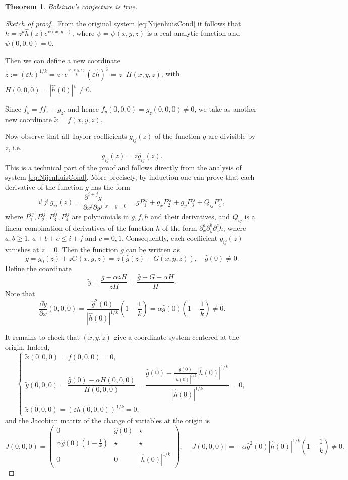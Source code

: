 \documentclass[10pt,a4paper]{amsart}
\newtheorem{Theorem}{Theorem}
\begin{document}
\begin{Theorem}
    Bolsinov's conjecture is true.
\end{Theorem}

\begin{proof}[Sketch of proof.]
From the original system \eqref{eq:NijenhuisCond} it follows that $h = z^k \hat{h}(z) e^{\psi(x,y,z)}$, where $\psi = \psi(x,y,z)$ is a real-analytic function and $\psi(0,0,0) = 0$.

Then we can define a new coordinate $\tilde z := (\varepsilon h)^{1/k} = z \cdot e^{\frac{\psi(x,y,z)}{k}}(\varepsilon \hat{h})^{\frac{1}{k}} = z \cdot H(x,y,z)$, with $H(0,0,0) = |\hat{h}(0)|^{\frac{1}{k}} \neq 0$.

Since $f_y = f f_z + g_z$, and hence $f_y(0,0,0) = g_z(0,0,0) \neq 0$, we take as another new coordinate $\tilde x = f(x,y,z)$.

Now observe that all Taylor coefficients \(g_{ij}(z)\) of the function $g$ are divisible by \(z\), i.e.
\[
g_{ij}(z)=z\hat g_{ij}(z).
\]
This is a technical part of the proof and follows directly from the analysis of system \eqref{eq:NijenhuisCond}. More precisely, by induction one can prove that each derivative of the function \(g\) has the form
\[
i!\,j!\,g_{ij}(z)
=
\frac{\partial^{i+j}g}{\partial x^i\partial y^j}\bigg|_{x=y=0}
=
gP_1^{ij}
+
g_xP_2^{ij}
+
g_yP_3^{ij}
+
Q_{ij}P_4^{ij},
\]
where \(P_1^{ij},P_2^{ij},P_3^{ij},P_4^{ij}\) are polynomials in \(g,f,h\) and their derivatives, and \(Q_{ij}\) is a linear combination of derivatives of the function $h$ of the form $\partial_x^a\partial_y^b\partial_z^c h$,
where \(a,b\ge 1\), \(a+b+c\le i+j\) and \(c=0,1\).
Consequently, each coefficient $g_{ij}(z)$ vanishes at \(z=0\).
Then the function $g$ can be written as
$$
g = g_0(z) + z G(x,y,z) = z\left(\hat{g}(z) + G(x,y,z)\right), \quad \hat{g}(0) \neq 0.
$$
Define the coordinate 
$$\tilde{y} = \frac{g - \alpha z H}{z H} = \frac{\hat{g} + G - \alpha H}{H}.$$  
Note that
$$\frac{\partial \tilde{y}}{\partial x}(0,0,0) = \frac{\hat{g}^2(0)}{|\hat{h}(0)|^{1/k}}\left(1 - \frac{1}{k} \right) = \alpha \hat{g}(0)\left(1 - \frac{1}{k} \right) \neq 0.
$$

It remains to check that $(\tilde{x}, \tilde{y}, \tilde{z})$ give a coordinate system centered at the origin. Indeed,
$$
\begin{cases}
    \tilde{x}(0,0,0) = f(0,0,0) = 0, \\
    \tilde{y}(0,0,0) = \dfrac{\hat{g}(0) - \alpha H(0,0,0)}{H(0,0,0)} = \dfrac{\hat{g}(0) - \frac{\hat{g}(0)}{|\hat{h}(0)|^{1/k}} |\hat{h}(0)|^{1/k}}{ |\hat{h}(0)|^{1/k}} = 0, \\
    \tilde{z}(0,0,0) = (\varepsilon h(0,0,0))^{1/k} = 0,
\end{cases}
$$
and the Jacobian matrix of the change of variables at the origin is
$$
J(0,0,0) = \begin{pmatrix}
    0 & \hat{g}(0) & \star \\
   \alpha \hat{g}(0)\left(1 - \frac{1}{k} \right) & \star & \star \\
    0 & 0 & |\hat{h}(0)|^{1/k}
\end{pmatrix}, \quad |J(0,0,0)| = -\alpha \hat{g}^2(0) |\hat{h}(0)|^{1/k} \left(1 - \frac{1}{k} \right) \neq 0.
$$


\end{proof}
\end{document}
